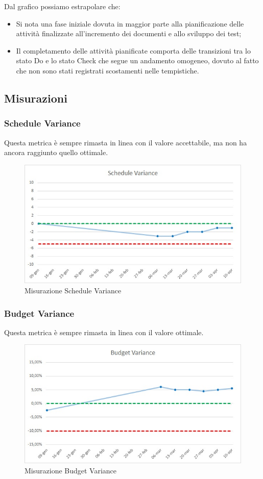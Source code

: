 Dal grafico possiamo estrapolare che:
\begin{itemize}
	\item Si nota una fase iniziale dovuta in maggior parte alla pianificazione delle attività finalizzate all'incremento dei documenti e allo sviluppo dei test;
	\item Il completamento delle attività pianificate comporta delle transizioni tra lo stato Do e lo stato Check che segue un andamento omogeneo, dovuto al fatto che non sono stati registrati scostamenti nelle tempistiche.
\end{itemize}
\newpage

\subsection{Misurazioni}

\subsubsection{Schedule Variance}
Questa metrica è sempre rimasta in linea con il valore accettabile, ma non ha ancora raggiunto quello ottimale.
\begin{figure} [H]
	\centering
	\includegraphics[scale=1]{Img/schedulev}
	\caption{Misurazione Schedule Variance}\label{}
\end{figure}

\subsubsection{Budget Variance}
Questa metrica è sempre rimasta in linea con il valore ottimale.
\begin{figure} [H]
	\centering
	\includegraphics[scale=1]{Img/budgetv}
	\caption{Misurazione Budget Variance}\label{}
\end{figure}

